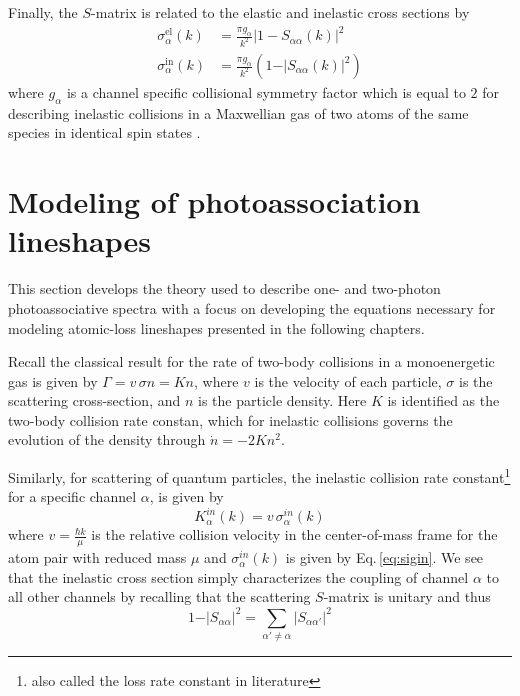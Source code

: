 Finally, the $S$-matrix is related to the elastic and inelastic cross sections by
\begingroup
\addtolength{\jot}{1em}
\begin{align}
	\sigma^{\text{el}}_{\alpha}(k) &= \frac{\pi g_{\alpha}}{k^2} \vert 1 - S_{\alpha \alpha}(k) \vert^2 \\
	\label{eq:sigin}	
	\sigma^{\text{in}}_{\alpha}(k) &= \frac{\pi g_{\alpha}}{k^2} \left( 1 - \vert S_{\alpha \alpha}(k) \vert^2 \right)
\end{align}	
\endgroup
where $g_{\alpha}$ is a channel specific collisional symmetry factor which is equal to $2$ for describing inelastic collisions in a Maxwellian gas of two atoms of the same species in identical spin states \cite{Chin2010}.


\section{Modeling of photoassociation lineshapes} \label{sec:bohn_and_julienne}
This section develops the theory used to describe one- and two-photon photoassociative spectra with a focus on developing the equations necessary for modeling atomic-loss lineshapes presented in the following chapters.

Recall the classical result for the rate of two-body collisions in a monoenergetic gas is given by $\Gamma = v \,\sigma n = K n$, where $v$ is the velocity of each particle, $\sigma$ is the scattering cross-section, and $n$ is the particle density.
Here $K$ is identified as the two-body collision rate constan, which for inelastic collisions governs the evolution of the density through $\dot{n} = -2 K n^2$.

Similarly, for scattering of quantum particles, the inelastic collision rate constant\footnote{also called the loss rate constant in literature} for a specific channel $\alpha$, is given by \cite{Nicholson2015a}
\begin{equation} \label{eq:simpleK}
	K^{in}_{\alpha}(k) = v\,\sigma^{in}_{\alpha}(k)
\end{equation}
where $v=\frac{\hbar k}{\mu}$ is the relative collision velocity in the center-of-mass frame for the atom pair with reduced mass $\mu$ and $\sigma^{in}_{\alpha}(k)$ is given by Eq.\,\ref{eq:sigin}.
We see that the inelastic cross section simply characterizes the coupling of channel $\alpha$ to all other channels by recalling that the scattering $S$-matrix is unitary and thus
\begin{equation}
	1 - \vert S_{\alpha \alpha} \vert^2 = \sum_{\alpha' \neq \alpha}\vert S_{\alpha \alpha'} \vert^2
\end{equation}

